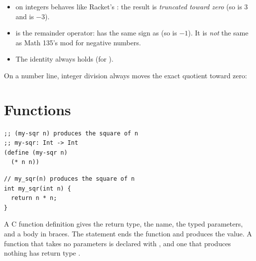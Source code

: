 \begin{important}
\begin{itemize}
  \item \code{/} on integers behaves like Racket's : the result is
    \emph{truncated toward zero} (so  is 3 and  is $-3$).
  \item \code{\%} is the remainder operator:  has the same sign as 
    (so  is $-1$). It is \emph{not} the same as Math 135's mod for negative
    numbers.
  \item The identity  always holds (for ).
\end{itemize}
\end{important}

On a number line, integer division always moves the exact quotient toward
zero:

\begin{center}
\end{center}

\section{Functions}

\begin{lstlisting}[style=racket]
;; (my-sqr n) produces the square of n
;; my-sqr: Int -> Int
(define (my-sqr n)
  (* n n))
\end{lstlisting}
\begin{lstlisting}[style=c]
// my_sqr(n) produces the square of n
int my_sqr(int n) {
  return n * n;
}
\end{lstlisting}
A C function definition gives the return type, the name, the typed parameters, and a body in
braces. The  statement ends the function and produces the value. A function that
takes no parameters is declared with , and one that produces nothing has return
type .

